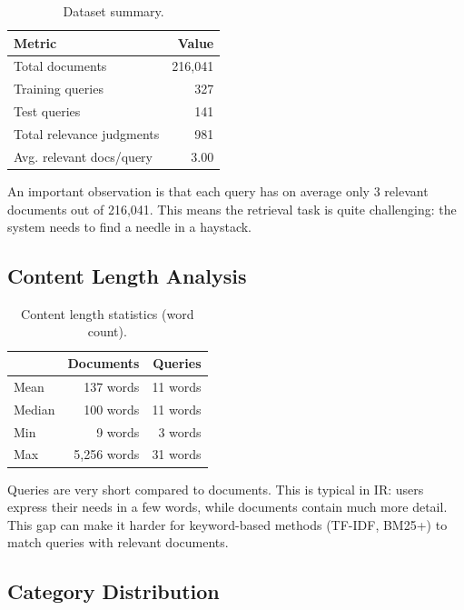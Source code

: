 \documentclass[12pt,a4paper]{article}
\begin{document}
\begin{table}[H]
    \centering
    \begin{tabular}{lr}
        \toprule
        \textbf{Metric} & \textbf{Value} \\
        \midrule
        Total documents           & 216,041 \\
        Training queries          & 327     \\
        Test queries              & 141     \\
        Total relevance judgments & 981     \\
        Avg. relevant docs/query  & 3.00    \\
        \bottomrule
    \end{tabular}
    \caption{Dataset summary.}
    \label{tab:dataset}
\end{table}

An important observation is that each query has on average only 3 relevant documents out of 216,041. This means the retrieval task is quite challenging: the system needs to find a needle in a haystack.

\subsection{Content Length Analysis}

\begin{table}[H]
    \centering
    \begin{tabular}{lrr}
        \toprule
        & \textbf{Documents} & \textbf{Queries} \\
        \midrule
        Mean   & 137 words & 11 words \\
        Median & 100 words & 11 words \\
        Min    & 9 words   & 3 words  \\
        Max    & 5,256 words & 31 words \\
        \bottomrule
    \end{tabular}
    \caption{Content length statistics (word count).}
    \label{tab:lengths}
\end{table}

Queries are very short compared to documents. This is typical in IR: users express their needs in a few words, while documents contain much more detail. This gap can make it harder for keyword-based methods (TF-IDF, BM25+) to match queries with relevant documents.

\subsection{Category Distribution}
\end{document}
